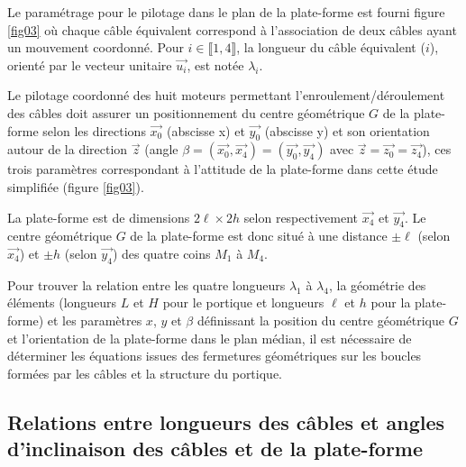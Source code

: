 
Le paramétrage pour le pilotage dans le plan de la plate-forme est fourni figure \ref{fig03} où chaque câble équivalent correspond à l’association de deux câbles ayant un mouvement coordonné. Pour $i\in \llbracket 1, 4 \rrbracket $, la longueur du câble équivalent ($i$), orienté par le vecteur unitaire $\vec{u_i}$, est notée $\lambda_i$.


Le pilotage coordonné des huit moteurs permettant l’enroulement/déroulement des câbles doit assurer un posi­tionnement du centre géométrique $G$ de la plate-forme selon les directions $\vec{x_0}$ (abscisse x) et $\vec{y_0}$ (abscisse y) et son orientation autour de la direction $\vec{z}$ (angle $\beta=(\vec{x_0},\vec{x_4})=(\vec{y_0},\vec{y_4})$ avec $\vec{z}=\vec{z_0}=\vec{z_4}$), ces trois paramètres correspondant à l’attitude de la plate-forme dans cette étude simplifiée (figure \ref{fig03}).

La plate-forme est de dimensions $2\ell\times 2h$ selon respectivement $\vec{x_4}$ et $\vec{y_4}$. Le centre géométrique $G$ de la plate-forme est donc situé à une distance $\pm \ell$ (selon $\vec{x_4}$) et $\pm h$ (selon $\vec{y_4}$) des quatre coins $M_1$ à $M_4$.

Pour trouver la relation entre les quatre longueurs $\lambda_1$ à $\lambda_4$, la géométrie des éléments (longueurs $L$ et $H$ pour le portique et longueurs $\ell$ et $h$ pour la plate-forme) et les paramètres $x$, $y$ et $\beta$ définissant la position du centre géométrique $G$ et l’orientation de la plate-forme dans le plan médian, il est nécessaire de déterminer les équations issues des fermetures géométriques sur les boucles formées par les câbles et la structure du portique.

\subsection{Relations entre longueurs des câbles et angles d’inclinaison des câbles et de la plate-forme}


